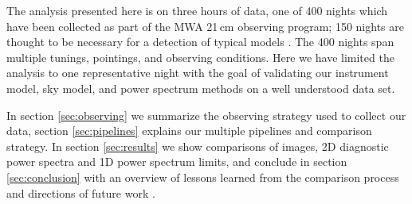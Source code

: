 \documentclass[preprint2]{aastex}
\def\eppsilon{{\it $\varepsilon$ppsilon}}
\def\empirical{DILLSPEC}
\begin{document}
The analysis presented here is on three hours of data, one of 400 nights which have been collected as part of the MWA 21\,cm observing program; 150 nights are thought to be necessary for a detection of typical models \citep{Beardsley:2013p9952}. The 400 nights span multiple tunings, pointings, and observing conditions. Here we have limited the analysis to one representative night with the goal of validating our instrument model, sky model, and power spectrum methods on a well understood data set. 







In section \ref{sec:observing} we summarize the observing strategy used to collect our data, section \ref{sec:pipelines} explains our multiple pipelines and comparison strategy. In section \ref{sec:results} we show comparisons of images, 2D diagnostic power spectra and 1D power spectrum limits, and conclude in section \ref{sec:conclusion} with an overview of lessons learned from the comparison process and directions of future work .
\end{document}
